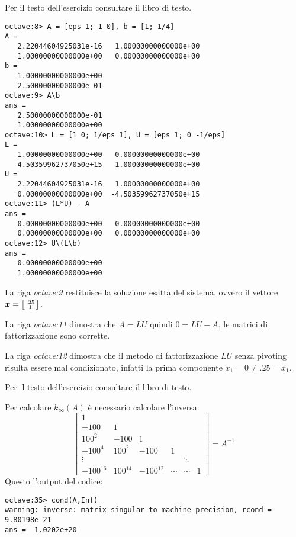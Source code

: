 \begin{exercise}[3.24]
\label{exercise:324}
Per il testo dell'esercizio consultare il libro di testo.
\end{exercise}
\begin{lstlisting}
octave:8> A = [eps 1; 1 0], b = [1; 1/4]
A =
   2.22044604925031e-16   1.00000000000000e+00
   1.00000000000000e+00   0.00000000000000e+00
b =
   1.00000000000000e+00
   2.50000000000000e-01
octave:9> A\b
ans =
   2.50000000000000e-01
   1.00000000000000e+00
octave:10> L = [1 0; 1/eps 1], U = [eps 1; 0 -1/eps]
L =
   1.00000000000000e+00   0.00000000000000e+00
   4.50359962737050e+15   1.00000000000000e+00
U =
   2.22044604925031e-16   1.00000000000000e+00
   0.00000000000000e+00  -4.50359962737050e+15
octave:11> (L*U) - A
ans =
   0.00000000000000e+00   0.00000000000000e+00
   0.00000000000000e+00   0.00000000000000e+00
octave:12> U\(L\b)
ans =
   0.00000000000000e+00
   1.00000000000000e+00
\end{lstlisting}
La riga \emph{octave:9} restituisce la soluzione esatta del sistema, ovvero il
vettore $\boldsymbol{x} = \bigl [ \begin{smallmatrix}
.25 \\
1
\end{smallmatrix}\bigr ]$.

La riga \emph{octave:11} dimostra che $A = LU$ quindi $0 = LU - A$, le matrici
di fattorizzazione sono corrette.

La riga \emph{octave:12} dimostra che il metodo di fattorizzazione $LU$ senza
pivoting risulta essere mal condizionato, infatti la prima componente
$\tilde{x}_{1} = 0 \not = .25 = x_{1}$.

\begin{exercise}[3.25]
Per il testo dell'esercizio consultare il libro di testo.
\end{exercise}
Per calcolare $k_{\infty}(A)$ \`e necessario calcolare l'inversa:
\begin{displaymath}
\begin{bmatrix}
1 \\
-100 & 1 \\ 
100^{2} & -100 & 1\\ 
-100^{4} & 100^{2} & -100 & 1\\
\vdots & & & & \ddots \\
-100^{16} & 100^{14} & -100^{12} & \cdots & \cdots &  1
\end{bmatrix} = A^{-1}
\end{displaymath}
Questo l'output del codice:
\begin{lstlisting}
octave:35> cond(A,Inf)
warning: inverse: matrix singular to machine precision, rcond = 9.80198e-21
ans =  1.0202e+20
\end{lstlisting}

